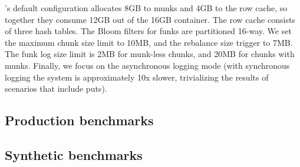\sys's default configuration 
allocates 8GB to munks and 4GB to the row cache,
so together they consume 12GB out of the 16GB container. 
The row cache consists of three hash tables.  
The Bloom filters for funks are partitioned 16-way.  
We set the \sys\/ maximum chunk size limit to 10MB, and the rebalance size trigger to 7MB. 
The funk log size limit is 2MB for munk-less chunks, and 20MB for chunks with munks. 
Finally, we focus on the asynchronous logging mode (with synchronous logging the system
is approximately 10x slower, trivializing the results of scenarios that include puts). 



\subsection{Production benchmarks}
\label{ssec:prod}

\subsection{Synthetic benchmarks}
\label{ssec:synthetic} 

